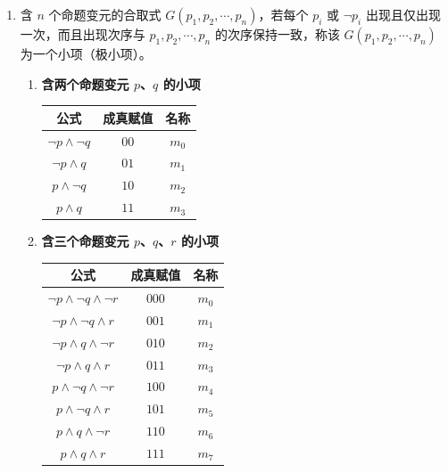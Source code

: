 \begin{enumerate}
	
	
	\item[\textbf{def 1：}] 含 \(n\) 个命题变元的合取式 \(G(p_{1},p_{2},\cdots,p_{n})\)，若每个 \(p_{i}\) 或 \(\neg p_{i}\) 出现且仅出现一次，而且出现次序与 \(p_{1},p_{2},\cdots,p_{n}\) 的次序保持一致，称该 \(G(p_{1},p_{2},\cdots,p_{n})\) 为一个小项（极小项）。
	
	\begin{enumerate}
		
		\item	\textbf{含两个命题变元 \(p\)、\(q\) 的小项}
		\begin{center}
			\begin{tabular}{|c|c|c|}
				\hline
				\textbf{公式} & \textbf{成真赋值} & \textbf{名称} \\
				\hline
				\(\neg p \land \neg q\) & \(00\) & \(m_0\) \\
				\hline
				\(\neg p \land q\) & \(01\) & \(m_1\) \\
				\hline
				\(p \land \neg q\) & \(10\) & \(m_2\) \\
				\hline
				\(p \land q\) & \(11\) & \(m_3\) \\
				\hline
			\end{tabular}
		\end{center}
		
		\item	\textbf{含三个命题变元 \(p\)、\(q\)、\(r\) 的小项}
		\begin{center}
			\begin{tabular}{|c|c|c|}
				\hline
				\textbf{公式} & \textbf{成真赋值} & \textbf{名称} \\
				\hline
				\(\neg p \land \neg q \land \neg r\) & \(000\) & \(m_0\) \\
				\hline
				\(\neg p \land \neg q \land r\) & \(001\) & \(m_1\) \\
				\hline
				\(\neg p \land q \land \neg r\) & \(010\) & \(m_2\) \\
				\hline
				\(\neg p \land q \land r\) & \(011\) & \(m_3\) \\
				\hline
				\(p \land \neg q \land \neg r\) & \(100\) & \(m_4\) \\
				\hline
				\(p \land \neg q \land r\) & \(101\) & \(m_5\) \\
				\hline
				\(p \land q \land \neg r\) & \(110\) & \(m_6\) \\
				\hline
				\(p \land q \land r\) & \(111\) & \(m_7\) \\
				\hline
			\end{tabular}
		\end{center}
		

\end{enumerate}
\end{enumerate}
